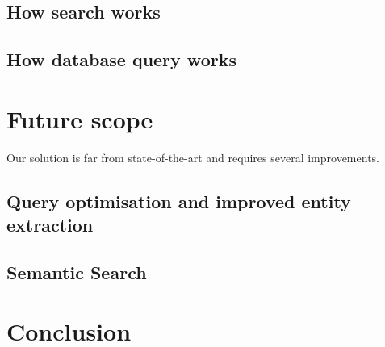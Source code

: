 \documentclass[a4paper,12pt,oneside]{book}
\begin{document}
\lipsum[5]

\section{How search works}

\lipsum[5]

\section{How database query works}
\blindtext

\chapter{Future scope}

Our solution is far from state-of-the-art and requires several improvements. 

\section{Query optimisation and improved entity extraction}
\blindtext

\section{Semantic Search}

\blindtext

\lipsum[2]

\chapter{Conclusion}
\blindtext



\end{document}
